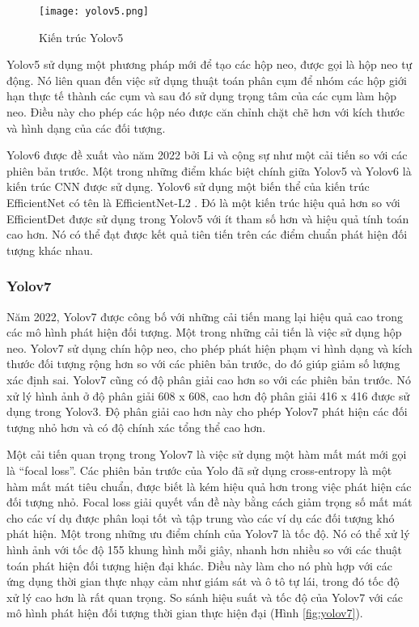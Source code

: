 \documentclass[../the.tex]{subfiles}
\begin{document}
\begin{figure}[H]
	\centering
	\texttt{[image: yolov5.png]}
	\caption{Kiến trúc Yolov5 \cite{s22020464}}
	\label{fig:yolov5}
\end{figure}

{\fontsize{13}{12} \selectfont

Yolov5 sử dụng một phương pháp mới để tạo các hộp neo, được gọi là hộp neo tự động.
Nó liên quan đến việc sử dụng thuật toán phân cụm để nhóm các hộp giới hạn thực tế thành các cụm và sau đó sử dụng trọng tâm của các cụm làm hộp neo.
Điều này cho phép các hộp néo được căn chỉnh chặt chẽ hơn với kích thước và hình dạng của các đối tượng.
}

\bigskip

{\fontsize{13}{12} \selectfont
Yolov6 \cite{li2022yolov6} được đề xuất vào năm 2022 bởi Li và cộng sự như một cải tiến so với các phiên bản trước.
Một trong những điểm khác biệt chính giữa Yolov5 và Yolov6 là kiến trúc CNN được sử dụng.
Yolov6 sử dụng một biến thể của kiến trúc EfficientNet có tên là EfficientNet-L2 \cite{yolov72023}.
Đó là một kiến trúc hiệu quả hơn so với EfficientDet được sử dụng trong Yolov5 với ít tham số hơn và hiệu quả tính toán cao hơn. Nó có thể đạt được kết quả tiên tiến trên các điểm chuẩn phát hiện đối tượng khác nhau.
}

\subsubsection{Yolov7}
\label{sec:yolov7}
{\fontsize{13}{12} \selectfont
	Năm 2022, Yolov7 \cite{wang2022yolov7} được công bố với những cải tiến mang lại hiệu quả cao trong các mô hình phát hiện đối tượng. Một trong những cải tiến là việc sử dụng hộp neo.
	Yolov7 sử dụng chín hộp neo, cho phép phát hiện phạm vi hình dạng và kích thước đối tượng rộng hơn so với các phiên bản trước, do đó giúp giảm số lượng xác định sai.
	Yolov7 cũng có độ phân giải cao hơn so với các phiên bản trước. Nó xử lý hình ảnh ở độ phân giải 608 x 608, cao hơn độ phân giải 416 x 416 được sử dụng trong Yolov3. Độ phân giải cao hơn này cho phép Yolov7 phát hiện các đối tượng nhỏ hơn và có độ chính xác tổng thể cao hơn.
}

\bigskip

{\fontsize{13}{12} \selectfont
	Một cải tiến quan trọng trong Yolov7 là việc sử dụng một hàm mất mát mới gọi là “focal loss”. Các phiên bản trước của Yolo đã sử dụng cross-entropy là một hàm mất mát tiêu chuẩn, được biết là kém hiệu quả hơn trong việc phát hiện các đối tượng nhỏ. Focal loss giải quyết vấn đề này bằng cách giảm trọng số mất mát cho các ví dụ được phân loại tốt và tập trung vào các ví dụ các đối tượng khó phát hiện.
	Một trong những ưu điểm chính của Yolov7 là tốc độ. Nó có thể xử lý hình ảnh với tốc độ 155 khung hình mỗi giây, nhanh hơn nhiều so với các thuật toán phát hiện đối tượng hiện đại khác. Điều này làm cho nó phù hợp với các ứng dụng thời gian thực nhạy cảm như giám sát và ô tô tự lái, trong đó tốc độ xử lý cao hơn là rất quan trọng.
	So sánh hiệu suất và tốc độ của Yolov7 với các mô hình phát hiện đối tượng thời gian thực hiện đại (Hình \ref{fig:yolov7}).
}
\end{document}
